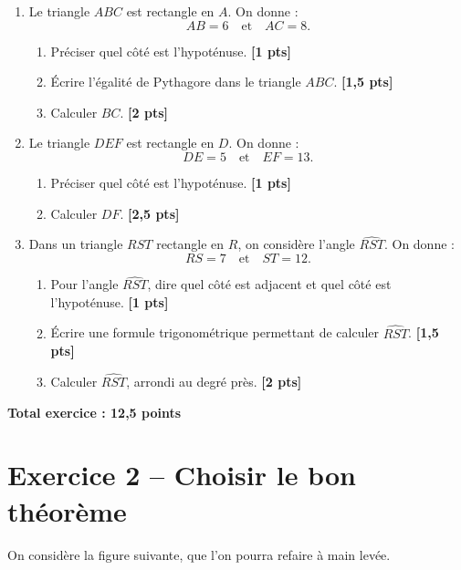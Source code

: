 \documentclass[11pt,a4paper]{article}
\newcommand{\points}[1]{\hfill \textbf{[#1 pts]}}
\newcommand{\totalexo}[1]{\begin{flushright}\textbf{Total exercice : #1 points}\end{flushright}}
\begin{document}
\begin{enumerate}
    \item Le triangle $ABC$ est rectangle en $A$. On donne :
    \[
    AB=6 \quad \text{et} \quad AC=8.
    \]
    \begin{enumerate}
        \item Préciser quel côté est l'hypoténuse. \points{1}
        \item Écrire l'égalité de Pythagore dans le triangle $ABC$. \points{1,5}
        \item Calculer $BC$. \points{2}
    \end{enumerate}

    \medskip

    \item Le triangle $DEF$ est rectangle en $D$. On donne :
    \[
    DE=5 \quad \text{et} \quad EF=13.
    \]
    \begin{enumerate}
        \item Préciser quel côté est l'hypoténuse. \points{1}
        \item Calculer $DF$. \points{2,5}
    \end{enumerate}

    \medskip

    \item Dans un triangle $RST$ rectangle en $R$, on considère l'angle $\widehat{RST}$. On donne :
    \[
    RS=7 \quad \text{et} \quad ST=12.
    \]
    \begin{enumerate}
        \item Pour l'angle $\widehat{RST}$, dire quel côté est adjacent et quel côté est l'hypoténuse. \points{1}
        \item Écrire une formule trigonométrique permettant de calculer $\widehat{RST}$. \points{1,5}
        \item Calculer $\widehat{RST}$, arrondi au degré près. \points{2}
    \end{enumerate}
\end{enumerate}

\totalexo{12,5}

\section*{Exercice 2 -- Choisir le bon théorème}

On considère la figure suivante, que l'on pourra refaire à main levée.

\medskip
\end{document}
